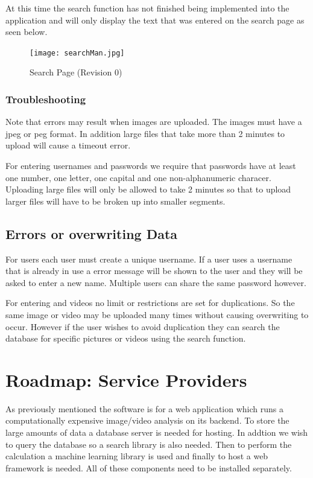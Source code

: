 \documentclass{scrreprt}
\begin{document}
At this time the search function has not finished being implemented into the application and will only display the text that was entered on the search page as seen below.

\begin{figure}
  \texttt{[image: searchMan.jpg]}
  \caption{Search Page (Revision 0)}
  \label{fig:searchPage}
\end{figure}


\subsubsection{Troubleshooting}

Note that errors may result when images are uploaded.  The images must have a jpeg or peg format.  In addition large files that take more than 2 minutes to upload will cause a timeout error.

For entering usernames and passwords we require that passwords have at least one number, one letter, one capital and one non-alphanumeric characer.  Uploading large files will only be allowed to take 2 minutes so that to upload larger files will have to be broken up into smaller segments.


\subsection{Errors or overwriting Data}

For users each user must create a unique username.  If a user uses a username that is already in use a error message will be shown to the user and they will be asked to enter a new name.  Multiple users can share the same password however.

For entering and videos no limit or restrictions are set for duplications.  So the same image or video may be uploaded many times without causing overwriting to occur.  However if the user wishes to avoid duplication they can search the database for specific pictures or videos using the search function.


\section{Roadmap: Service Providers}

As previously mentioned the software is for a  web application which runs a computationally expensive image/video analysis on its backend. To store the large amounts of data a database server is needed for hosting.  In addtion we wish to query the database so a search library is also needed. Then to perform the calculation a machine learning library is used and finally to host a web framework is needed. All of these components need to be installed separately.
\end{document}
